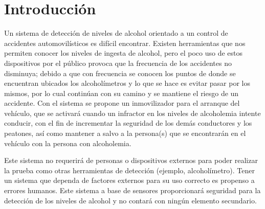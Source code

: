 \section{Introducción}
Un sistema de detección de niveles de alcohol orientado a un control de accidentes automovilísticos es difícil encontrar. Existen herramientas que nos permiten conocer los niveles de ingesta de alcohol, pero el poco uso de estos dispositivos por el público provoca que la frecuencia de los accidentes no disminuya; debido a que con frecuencia se conocen los puntos de donde se encuentran ubicados los alcoholímetros y lo que se hace es evitar pasar por los mismos, por lo cual continúan con su camino y se mantiene el riesgo de un accidente.  Con el sistema se propone un inmovilizador para el arranque del vehículo, que se activará cuando un infractor en los niveles de alcoholemia intente conducir, con el fin de incrementar la seguridad de los demás conductores y los peatones, así como mantener a salvo a la persona(s) que se encontrarán en el vehículo con la persona con alcoholemia.\par
Este sistema no requerirá de personas o dispositivos externos para poder realizar la prueba como otras herramientas de detección (ejemplo, alcoholímetro). Tener un sistema que dependa de factores externos para su uso correcto es propenso a errores humanos. Este sistema a base de sensores proporcionará seguridad para la detección de los niveles de alcohol y no contará con ningún elemento secundario.